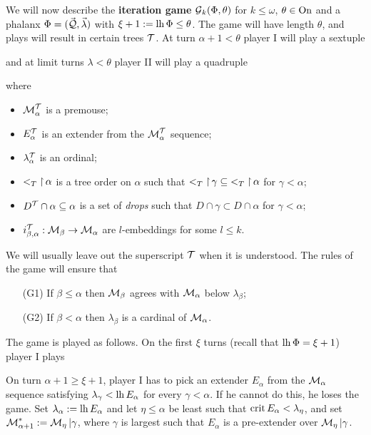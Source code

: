 We will now describe the \textbf{iteration game} $\operatorname{\mathcal{G}}_k(\Phi,\theta)$ for $k\leq\omega$, $\theta\in\operatorname{On}$ and a phalanx $\Phi=(\vec{\operatorname{\mathcal{Q}}},\vec\lambda)$ with $\xi+1:=\operatorname{lh}\Phi\leq\theta$. The game will have length $\theta$, and plays will result in certain trees $\operatorname{\mathcal{T}}$. At turn $\alpha+1<\theta$ player I will play a sextuple

and at limit turns $\lambda<\theta$ player II will play a quadruple

where
\begin{itemize}
\item $\operatorname{\mathcal{M}}_\alpha^{\operatorname{\mathcal{T}}}$ is a premouse;
\item $E_\alpha^{\operatorname{\mathcal{T}}}$ is an extender from the $\operatorname{\mathcal{M}}_\alpha^{\operatorname{\mathcal{T}}}$ sequence;
\item $\lambda_\alpha^{\operatorname{\mathcal{T}}}$ is an ordinal;
\item $<_T\operatorname{\upharpoonright}\alpha$ is a tree order on $\alpha$ such that ${<_T\operatorname{\upharpoonright}\gamma}\subseteq{<_T\operatorname{\upharpoonright}\alpha}$ for $\gamma<\alpha$;
\item $D^{\operatorname{\mathcal{T}}}\cap\alpha\subseteq\alpha$ is a set of \textit{drops} such that $D\cap\gamma\subset D\cap\alpha$ for $\gamma<\alpha$;
\item $i^{\operatorname{\mathcal{T}}}_{\beta,\alpha}:\operatorname{\mathcal{M}}_\beta\to\operatorname{\mathcal{M}}_\alpha$ are $l$-embeddings for some $l\leq k$.\\
\end{itemize}

We will usually leave out the superscript $\operatorname{\mathcal{T}}$ when it is understood. The rules of the game will ensure that
\begin{itemize}
\item[(G1)] If $\beta\leq\alpha$ then $\operatorname{\mathcal{M}}_\beta$ agrees with $\operatorname{\mathcal{M}}_\alpha$ below $\lambda_\beta$;
\item[(G2)] If $\beta<\alpha$ then $\lambda_\beta$ is a cardinal of $\operatorname{\mathcal{M}}_\alpha$.\\
\end{itemize}

The game is played as follows. On the first $\xi$ turns (recall that $\operatorname{lh}\Phi=\xi+1$) player I plays

On turn $\alpha+1\geq\xi+1$, player I has to pick an extender $E_\alpha$ from the $\operatorname{\mathcal{M}}_\alpha$ sequence satisfying $\lambda_\gamma<\operatorname{lh} E_\alpha$ for every $\gamma<\alpha$. If he cannot do this, he loses the game. Set $\lambda_\alpha:=\operatorname{lh} E_\alpha$ and let $\eta\leq\alpha$ be least such that $\operatorname{crit} E_\alpha<\lambda_\eta$, and set $\operatorname{\mathcal{M}}_{\alpha+1}^*:=\operatorname{\mathcal{M}}_\eta|\gamma$, where $\gamma$ is largest such that $E_\alpha$ is a pre-extender over $\operatorname{\mathcal{M}}_\eta|\gamma$.

